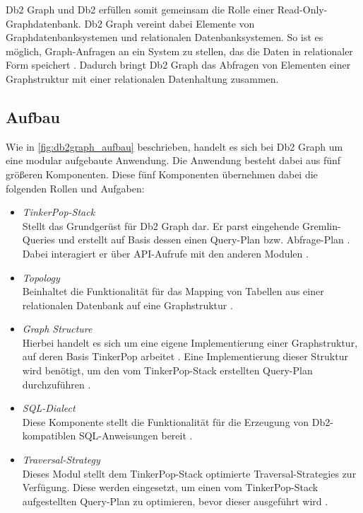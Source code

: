 Db2 Graph und Db2 erfüllen somit gemeinsam die Rolle einer Read-Only-Graph\-daten\-bank. Db2 Graph vereint dabei Elemente von Graphdatenbanksystemen und relationalen Datenbanksystemen. So ist es möglich, Graph-Anfragen an ein System zu stellen, das die Daten in relationaler Form speichert \cite{vldb_tian, sigmod_tian}. Dadurch bringt Db2 Graph das Abfragen von Elementen einer Graphstruktur mit einer relationalen Datenhaltung zusammen. 

\subsection{Aufbau}
Wie in \autoref{fig:db2graph_aufbau} beschrieben, handelt es sich bei Db2 Graph um eine modular aufgebaute Anwendung. Die Anwendung besteht dabei aus fünf größeren Komponenten. Diese fünf Komponenten übernehmen dabei die folgenden Rollen und Aufgaben: 

\begin{itemize}
    \item \textit{TinkerPop-Stack}\\Stellt das Grundgerüst für Db2 Graph dar. Er parst eingehende Gremlin-Queries und erstellt auf Basis dessen einen Query-Plan bzw. Abfrage-Plan \cite{vldb_tian}. Dabei interagiert er über API-Aufrufe mit den anderen Modulen \cite{vldb_tian}.
    \item \textit{Topology}\\Beinhaltet die Funktionalität für das Mapping von Tabellen aus einer relationalen Datenbank auf eine Graphstruktur \cite{vldb_tian, sigmod_tian}.
    \item \textit{Graph Structure}\\Hierbei handelt es sich um eine eigene Implementierung einer Graphstruktur, auf deren Basis TinkerPop arbeitet \cite{vldb_tian}. Eine Implementierung dieser Struktur wird benötigt, um den vom TinkerPop-Stack erstellten Query-Plan durchzuführen \cite{sigmod_tian}. 
    \item \textit{SQL-Dialect}\\Diese Komponente stellt die Funktionalität für die Erzeugung von Db2-kompatiblen SQL-Anweisungen bereit \cite{sigmod_tian}.
    \item \textit{Traversal-Strategy}\\Dieses Modul stellt dem TinkerPop-Stack optimierte Traversal-Strategies zur Verfügung. Diese werden eingesetzt, um einen vom TinkerPop-Stack aufgestellten Query-Plan zu optimieren, bevor dieser ausgeführt wird \cite{sigmod_tian}.  
\end{itemize}

